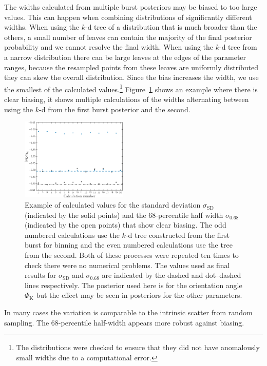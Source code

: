 \documentclass[useAMS,usedcolumn,usegraphicx,usenatbib]{mn2e}
\newcommand{\Figref}[1]{Figure~\ref{fig:#1}}
\newcommand{\sub}[1]{\ensuremath{_\mathrm{#1}}}
\begin{document}
The widths calculated from multiple burst posteriors may be biased to too large values. This can happen when combining distributions of significantly different widths. When using the $k$-d tree of a distribution that is much broader than the others, a small number of leaves can contain the majority of the final posterior probability and we cannot resolve the final width. When using the $k$-d tree from a narrow distribution there can be large leaves at the edges of the parameter ranges, because the resampled points from these leaves are uniformly distributed they can skew the overall distribution. Since the bias increases the width, we use the smallest of the calculated values.\footnote{The distributions were checked to ensure that they did not have anomalously small widths due to a computational error.} \Figref{bias} shows an example where there is clear biasing, it shows multiple calculations of the widths alternating between using the $k$-d from the first burst posterior and the second.
\begin{figure}
\begin{center}
   \includegraphics[width=0.45\textwidth]{Fig_bias_sigma_4_85}
\caption{Example of calculated values for the standard deviation $\sigma\sub{SD}$ (indicated by the solid points) and the $68$-percentile half width $\sigma\sub{0.68}$ (indicated by the open points) that show clear biasing. The odd numbered calculations use the $k$-d tree constructed from the first burst for binning and the even numbered calculations use the tree from the second. Both of these processes were repeated ten times to check there were no numerical problems. The values used as final results for $\sigma\sub{SD}$ and $\sigma\sub{0.68}$ are indicated by the dashed and dot--dashed lines respectively. The posterior used here is for the orientation angle $\Phi\sub{K}$ but the effect may be seen in posteriors for the other parameters.\label{fig:bias}}
  \end{center}
\end{figure}
In many cases the variation is comparable to the intrinsic scatter from random sampling. The $68$-percentile half-width appears more robust against biasing.
\end{document}
